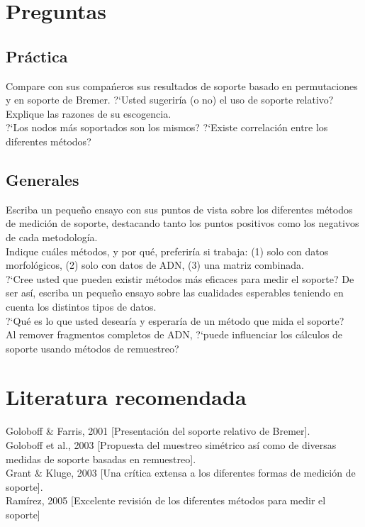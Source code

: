 \section{Preguntas}
\subsection{Pr\'actica}
\noindent
Compare con sus compa\'neros sus resultados de soporte basado en permutaciones y en soporte de Bremer. ?`Usted sugerir\'ia (o no) el uso de soporte relativo? Explique las razones de su escogencia.\\
?`Los nodos m\'as soportados son los mismos? ?`Existe correlaci\'on entre los diferentes m\'etodos?
\subsection{Generales}
\noindent
Escriba un peque\~no ensayo con sus puntos de vista sobre los diferentes m\'etodos de medici\'on de soporte, destacando tanto los puntos positivos como los negativos de cada metodolog\'ia.\\
Indique cu\'ales m\'etodos, y por qu\'e, preferir\'ia si trabaja: (1) solo con datos morfol\'ogicos, (2) solo con datos de ADN, (3) una matriz combinada.\\
?`Cree usted que pueden existir m\'etodos m\'as eficaces para medir el soporte? De ser as\'i, escriba un peque\~no ensayo sobre las cualidades esperables teniendo en cuenta los distintos tipos de datos.\\
?`Qu\'e es lo que usted desear\'ia y esperar\'ia de un m\'etodo que mida el soporte?\\
 Al remover fragmentos completos de ADN, ?`puede influenciar los c\'alculos de soporte usando m\'etodos de remuestreo?
\section{Literatura recomendada}
\noindent
Goloboff \& Farris, 2001 [Presentaci\'on del soporte relativo de Bremer].\\
Goloboff et al., 2003 [Propuesta del muestreo sim\'etrico as\'i como de diversas medidas de soporte basadas en remuestreo].\\
Grant \& Kluge, 2003 [Una cr\'itica extensa a los diferentes formas de medici\'on de soporte].\\
Ram\'irez, 2005 [Excelente revisi\'on de los diferentes m\'etodos para medir el soporte]
